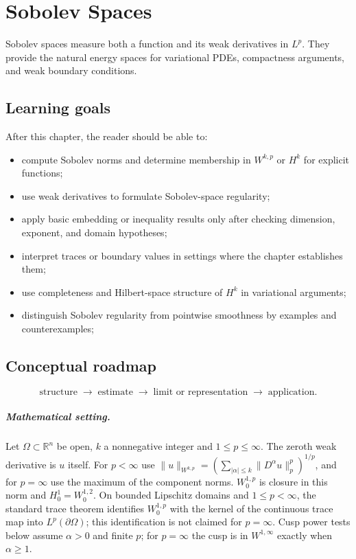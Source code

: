 \chapter{Sobolev Spaces}
\label{ch:iii21}

Sobolev spaces measure both a function and its weak derivatives in $L^p$. They provide the natural energy spaces for variational PDEs, compactness arguments, and weak boundary conditions.

\section*{Learning goals}
After this chapter, the reader should be able to:
\begin{itemize}
\item compute Sobolev norms and determine membership in \(W^{k,p}\) or \(H^k\) for explicit functions;
\item use weak derivatives to formulate Sobolev-space regularity;
\item apply basic embedding or inequality results only after checking dimension, exponent, and domain hypotheses;
\item interpret traces or boundary values in settings where the chapter establishes them;
\item use completeness and Hilbert-space structure of \(H^k\) in variational arguments;
\item distinguish Sobolev regularity from pointwise smoothness by examples and counterexamples;
\end{itemize}
\section*{Conceptual roadmap}
\[
\boxed{\text{structure}\;\longrightarrow\;\text{estimate}\;\longrightarrow\;\text{limit or representation}\;\longrightarrow\;\text{application}.}
\]

\paragraph{Mathematical setting.}
Let $\Omega\subset\mathbb R^n$ be open, $k$ a nonnegative integer and $1\le p\le\infty$. The zeroth weak derivative is $u$ itself. For $p<\infty$ use $\|u\|_{W^{k,p}}=(\sum_{|\alpha|\le k}\|D^\alpha u\|_p^p)^{1/p}$, and for $p=\infty$ use the maximum of the component norms. $W_0^{1,p}$ is closure in this norm and $H_0^1=W_0^{1,2}$. On bounded Lipschitz domains and $1\le p<\infty$, the standard trace theorem identifies $W_0^{1,p}$ with the kernel of the continuous trace map into $L^p(\partial\Omega)$; this identification is not claimed for $p=\infty$. Cusp power tests below assume $\alpha>0$ and finite $p$; for $p=\infty$ the cusp is in $W^{1,\infty}$ exactly when $\alpha\ge1$.

